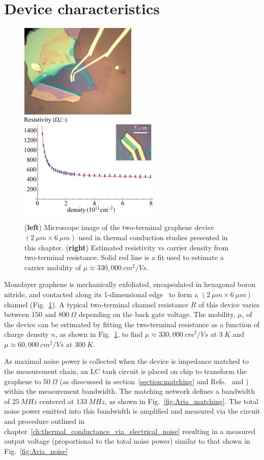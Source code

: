 \section{Device characteristics}
\begin{figure}
\centering
\includegraphics[height=45mm, valign=t]{figures/high_density_graphene/picture_aria.jpg}
\includegraphics[height=50mm, valign=t]{figures/high_density_graphene/mobility.png}
\caption{(\textbf{left}) Microscope image of the two-terminal graphene device $(2~\mu m\times6~\mu m)$ used in thermal conduction studies presented in this chapter. (\textbf{right}) Estimated resistivity vs carrier density from two-terminal resistance. Solid red line is a fit used to estimate a carrier mobility of $\mu\approx 330,000~cm^2/Vs$.}
\label{fig:Aria}
\end{figure}
Monolayer graphene is mechanically exfoliated, encapsulated in hexagonal boron nitride, and contacted along its 1-dimensional edge~\cite{wang_one-dimensional_2013} to form a $(2~\mu m\times6~\mu m)$ channel (Fig.~\ref{fig:Aria}). A typical two-terminal channel resistance $R$ of this device varies between $150$ and $800~\Omega$ depending on the back gate voltage. The mobility, $\mu$, of the device can be estimated by fitting the two-terminal resistance as a function of charge density $n$, as shown in Fig.~\ref{fig:Aria}, to find $\mu\approx 330,000~cm^2/Vs$ at $3~K$ and $\mu\approx 60,000~cm^2/Vs$ at $300~K$.

As maximal noise power is collected when the device is impedance matched to the measurement chain, an LC tank circuit is placed on chip to transform the graphene to $50~\Omega$ (as disscussed in section~\ref{section:matching} and Refs.~\cite{fong_ultrasensitive_2012} and  \cite{schoelkopf_radio-frequency_1998}) within the measurement bandwidth. The matching network defines a bandwidth of ${25~MHz}$ centered at ${133~MHz}$, as shown in Fig.~\ref{fig:Aria_matching}. The total noise power emitted into this bandwidth is amplified and measured via the circuit and procedure outlined in chapter~\ref{ch:thermal_conductance_via_electrical_noise} resulting in a measured output voltage (proportional to the total noise power) similar to that shown in Fig.~\ref{fig:Aria_noise}

